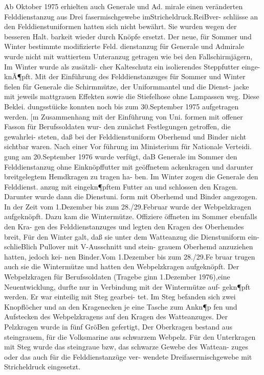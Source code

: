 

Ab Oktober 1975 erhielten auch Generale und Ad.
mirale einen veränderten Felddienstanzug aus Drei
fasermischgewebe imStricheldruck.ReiBver-
schliisse an den Felddienstuniformen hatten sich
nicht bewährt. Sie wurden wegen der besseren Halt.
barkeit wieder durch Knöpfe ersetzt. Der neue, für
Sommer und Winter bestimmte modifizierte Feld.
dienstanzug für Generale und Admirale wurde
nicht mit wattiertem Unteranzug getragen wie bei
den Fallschirmjägern, Im Winter wurde als zusätzli-
cher Kalteschutz ein isolierendes Steppfutter einge-
knÃ¶pft. Mit der Einführung des Felddienstanzuges
für Sommer und Winter fielen fǔr Generale die
Schirmmütze, der Uniformmantel und die Dienst-
jacke mit jeweils mattgrauen Effekten sowie die
Stiefelhose ohne Lampassen weg. Diese Beklei.
dungsstüicke konnten noch bis zum 30.September
1975 aufgetragen werden.
[m Zusammenhang mit der Einführung von Uni.
formen mit offener Fasson für Berufssoldaten wur-
den zunächst Festlegungen getroffen, die gewahrlei-
steten, daß bei der Felddienstuniform Oberhemd
und Binder nicht sichtbar waren. Nach einer Vor
führung im Ministerium für Nationale Verteidi.
gung am 20.September 1976 wurde verfügt, daB
Generale im
Sommer den Felddienstanzug ohne Einknöpffutter mit geöffnetem ackenkragen und
darunter breitgelegtem Hemdkragen zu tragen ha-
ben. Im Winter zogen die Generale den Felddienst.
anzug mit eingekn¶pftem Futter an und schlossen
den Kragen. Darunter wurde dann die Dienstuni.
form mit Oberhemd und Binder angezogen. In der
Zeit vom 1.Dezember bis zum 28./29.Februar
wurde der Webpelzkragen aufgeknöpft. Dazu kam
die Wintermütze.
Offiziere öffneten im Sommer ebenfalls den Kra-
gen des Felddienstanzuges und legten den Kragen
des Oberhemdes breit, Für den Winter galt, daß sie
unter dem Watteanzug die Dienstuniform ein-
schlieBlich Pullover mit V-Ausschnitt und stein-
grauem Oberhemd anzuziehen hatten, jedoch kei-
nen Binder.Vom 1.Dezember bis zum 28./29.Fe
bruar trugen auch sie die Wintermütze und hatten
den Webpelzkragen aufgeknöpft.
Der Webpelzkragen für Berufssoldaten (Tragebe
ginn 1.Dezember 1976),eine Neuentwicklung,
durfte nur in Verbindung mit der Wintermütze auf-
gekn¶pft werden. Er war einteilig mit Steg gearbei-
tet. Im Steg befanden sich zwei Knopflöcher und
an den Kragenecken je eine Tasche zum Ankn¶p
fen und Aufstecken des Webpelzkragens auf den
Kragen des Watteanzuges. Der Pelzkragen wurde in
fünf GröBen gefertigt, Der Oberkragen bestand aus
steingrauem, für die Volksmarine aus schwarzem
Webpelz. Für den Unterkragen mit Steg wurde das
steingraue bzw, das schwarze Gewebe des Wattean-
zuges oder das auch für die Felddienstanzüge ver-
wendete Dreifasermischgewebe mit Stricheldruck
eingesetzt.